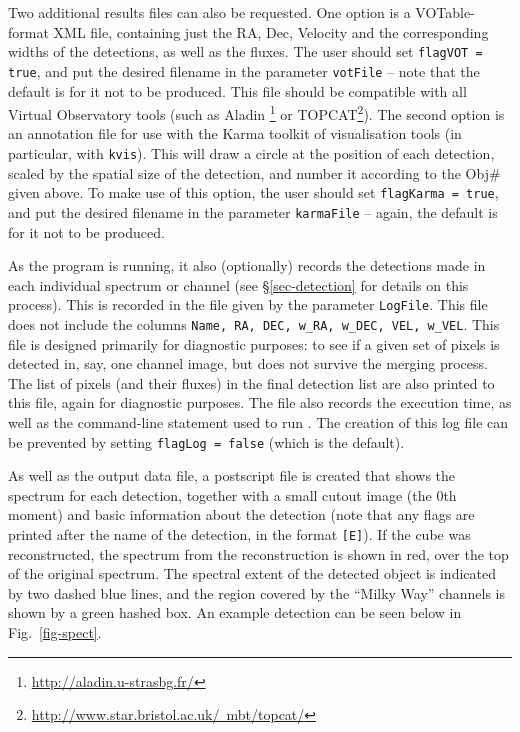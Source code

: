 Two additional results files can also be requested. One option is a
VOTable-format XML file, containing just the RA, Dec, Velocity and the
corresponding widths of the detections, as well as the fluxes. The
user should set \texttt{flagVOT = true}, and put the desired filename
in the parameter \texttt{votFile} -- note that the default is for it
not to be produced. This file should be compatible with all Virtual
Observatory tools (such as Aladin%
\footnote{%
\href{http://aladin.u-strasbg.fr/}{http://aladin.u-strasbg.fr/}}
or TOPCAT\footnote{%
\href{http://www.star.bristol.ac.uk/~mbt/topcat/}%
{http://www.star.bristol.ac.uk/~mbt/topcat/}}). The second option is
an annotation file for use with the Karma toolkit of visualisation
tools (in particular, with \texttt{kvis}). This will draw a circle at
the position of each detection, scaled by the spatial size of the
detection, and number it according to the Obj\# given above. To make
use of this option, the user should set
\texttt{flagKarma = true}, and put the desired filename in the parameter
\texttt{karmaFile} -- again, the default is for it not to be produced.

As the program is running, it also (optionally) records the detections
made in each individual spectrum or channel (see \S\ref{sec-detection}
for details on this process). This is recorded in the file given by
the parameter \texttt{LogFile}. This file does not include the columns
\texttt{Name, RA, DEC, w\_RA, w\_DEC, VEL, w\_VEL}. This file is
designed primarily for diagnostic purposes: \eg to see if a given set
of pixels is detected in, say, one channel image, but does not survive
the merging process. The list of pixels (and their fluxes) in the
final detection list are also printed to this file, again for
diagnostic purposes. The file also records the execution time, as well
as the command-line statement used to run \duchamp. The creation of
this log file can be prevented by setting \texttt{flagLog = false}
(which is the default).


As well as the output data file, a postscript file is created that
shows the spectrum for each detection, together with a small cutout
image (the 0th moment) and basic information about the detection (note
that any flags are printed after the name of the detection, in the
format \texttt{[E]}). If the cube was reconstructed, the spectrum from
the reconstruction is shown in red, over the top of the original
spectrum. The spectral extent of the detected object is indicated by
two dashed blue lines, and the region covered by the ``Milky Way''
channels is shown by a green hashed box. An example detection can be
seen below in Fig.~\ref{fig-spect}.

